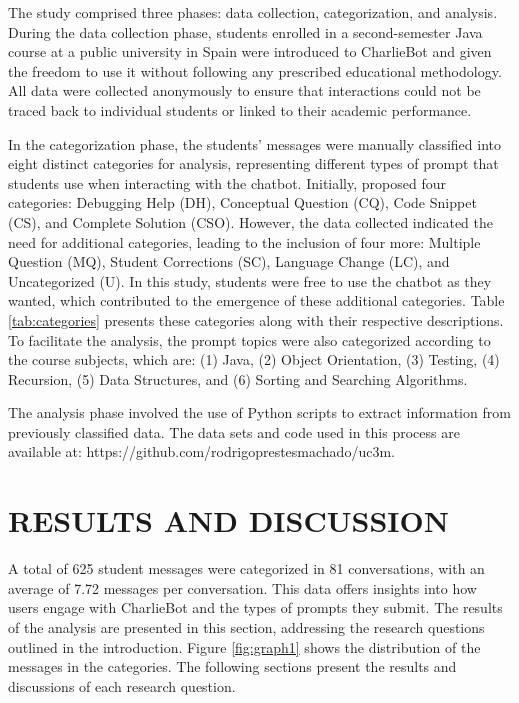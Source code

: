 \documentclass[a4paper,twoside]{article}
\begin{document}
The study comprised three phases: data collection, categorization, and analysis.
During the data collection phase, students enrolled in a second-semester Java
course at a public university in Spain were introduced to CharlieBot and given
the freedom to use it without following any prescribed educational methodology.
All data were collected anonymously to ensure that interactions could not be
traced back to individual students or linked to their academic performance.

In the categorization phase, the students' messages were manually classified
into eight distinct categories for analysis, representing different types of
prompt that students use when interacting with the chatbot. Initially,
\cite{Ghimire24} proposed four categories: Debugging Help (DH), Conceptual
Question (CQ), Code Snippet (CS), and Complete Solution (CSO). However, the data
collected indicated the need for additional categories, leading to the inclusion
of four more: Multiple Question (MQ), Student Corrections (SC), Language Change
(LC), and Uncategorized (U). In this study, students were free to use the
chatbot as they wanted, which contributed to the emergence of these additional
categories. Table \ref{tab:categories} presents these categories along with
their respective descriptions. To facilitate the analysis, the prompt topics
were also categorized according to the course subjects, which are: (1) Java, (2)
Object Orientation, (3) Testing, (4) Recursion, (5) Data Structures, and (6)
Sorting and Searching Algorithms.

The analysis phase involved the use of Python scripts to extract information
from previously classified data. The data sets and code used in this process are
available at: https://github.com/rodrigoprestesmachado/uc3m.

\section{\uppercase{Results and Discussion}}

A total of 625 student messages were categorized in 81 conversations, with
an average of 7.72 messages per conversation. This data offers insights into how
users engage with CharlieBot and the types of prompts they submit. The results
of the analysis are presented in this section, addressing the research questions
outlined in the introduction. Figure \ref{fig:graph1} shows the distribution of
the messages in the categories. The following sections present the results and
discussions of each research question.
\end{document}
